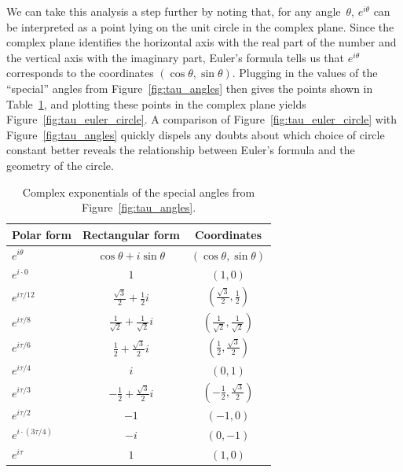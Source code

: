 We can take this analysis a step further by noting that, for any angle~$\theta$, $e^{i\theta}$ can be interpreted as a point lying on the unit circle in the complex plane. Since the complex plane identifies the horizontal axis with the real part of the number and the vertical axis with the imaginary part, Euler's formula tells us that $e^{i\theta}$ corresponds to the coordinates $(\cos\theta, \sin\theta)$. Plugging in the values of the ``special'' angles from Figure~\ref{fig:tau_angles} then gives the points shown in Table~\ref{table:complex_exponentials}, and plotting these points in the complex plane yields Figure~\ref{fig:tau_euler_circle}. A comparison of Figure~\ref{fig:tau_euler_circle} with Figure~\ref{fig:tau_angles} quickly dispels any doubts about which choice of circle constant better reveals the relationship between Euler's formula and the geometry of the circle.

\begin{table}
\begin{center}
\begin{tabular}{lcc}
Polar form & Rectangular form & Coordinates \\ \hline\hline
$e^{i\theta}$ & $\cos\theta + i\sin\theta$ & $(\cos\theta, \sin\theta)$ \\ \hline
$e^{i\cdot0}$ & $1$ & $(1, 0)$ \smallskip \\
$e^{i\tau/12}$ & $\frac{\sqrt{3}}{2} + \frac{1}{2}i$ & $(\frac{\sqrt{3}}{2}, \frac{1}{2})$ \smallskip \\
$e^{i\tau/8}$ & $\frac{1}{\sqrt{2}} +  \frac{1}{\sqrt{2}}i$ & $(\frac{1}{\sqrt{2}}, \frac{1}{\sqrt{2}})$ \smallskip \\
$e^{i\tau/6}$ & $\frac{1}{2} +\frac{\sqrt{3}}{2} i$ & $(\frac{1}{2}, \frac{\sqrt{3}}{2})$ \smallskip \\
$e^{i\tau/4}$ & $i$ & $(0, 1)$ \smallskip \\
$e^{i\tau/3}$ & $-\frac{1}{2} +\frac{\sqrt{3}}{2} i$ & $(-\frac{1}{2}, \frac{\sqrt{3}}{2})$ \smallskip \\
$e^{i\tau/2}$ & $-1$ & $(-1, 0)$ \smallskip \\
$e^{i\cdot(3\tau/4)}$ & $-i$ & $(0, -1)$ \smallskip \\
$e^{i\tau}$ & $1$ & $(1, 0)$
\end{tabular}
\end{center}
\caption{Complex exponentials of the special angles from Figure~\ref{fig:tau_angles}.\label{table:complex_exponentials}}
\end{table}

